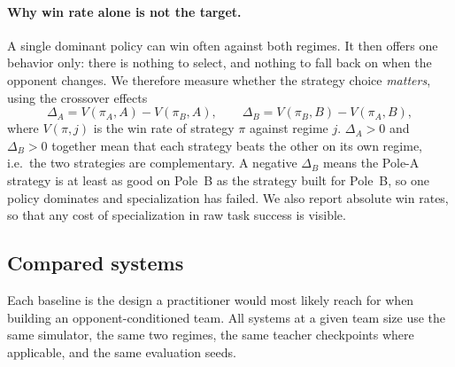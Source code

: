 \paragraph{Why win rate alone is not the target.}
A single dominant policy can win often against both regimes. It then offers
one behavior only: there is nothing to select, and nothing to fall back on
when the opponent changes. We therefore measure whether the strategy choice
\emph{matters}, using the crossover effects
\[
\Delta_A = V(\pi_A,A)-V(\pi_B,A),\qquad
\Delta_B = V(\pi_B,B)-V(\pi_A,B),
\]
where \(V(\pi,j)\) is the win rate of strategy \(\pi\) against regime \(j\).
\(\Delta_A>0\) and \(\Delta_B>0\) together mean that each strategy beats the
other on its own regime, i.e.\ the two strategies are complementary. A
negative \(\Delta_B\) means the Pole-A strategy is at least as good on Pole~B
as the strategy built for Pole~B, so one policy dominates and specialization
has failed. We also report absolute win rates, so that any cost of
specialization in raw task success is visible.

\subsection{Compared systems}
\label{sec:method-systems}

Each baseline is the design a practitioner would most likely reach for when
building an opponent-conditioned team. All systems at a given team size use
the same simulator, the same two regimes, the same teacher checkpoints where
applicable, and the same evaluation seeds.

